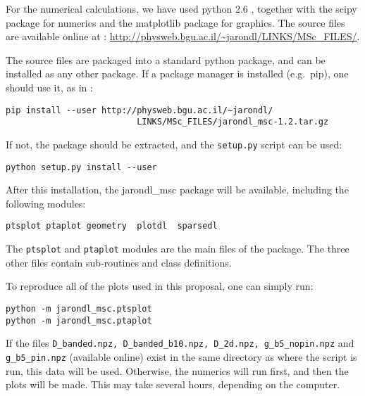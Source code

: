 For the numerical calculations, we have used python 2.6 \cite{guido_van_rossum_python}, together
with the scipy \cite{jones_scipy} package for numerics and the matplotlib \cite{hunter_matplotlib:_2007} package
for graphics. The source files are available online at : 
\url{http://physweb.bgu.ac.il/~jarondl/LINKS/MSc_FILES/}.


The source files are packaged into a standard python package,
and can be installed as any other package. If a package manager is installed (e.g.\ pip),
one should use it, as in :
\begin{verbatim}
pip install --user http://physweb.bgu.ac.il/~jarondl/
                          LINKS/MSc_FILES/jarondl_msc-1.2.tar.gz
\end{verbatim}
If not, the package should be extracted, and the \texttt{setup.py} script can be used:
\begin{verbatim}
python setup.py install --user
\end{verbatim}
After this installation, the jarondl\_msc package will be available,
including the following modules:
\begin{verbatim}
ptsplot ptaplot geometry  plotdl  sparsedl
\end{verbatim}

The \texttt{ptsplot} and \texttt{ptaplot} modules are the main files of the package. The three other files contain
sub-routines and class definitions.


To reproduce all of the plots used in this proposal, one can simply run:
\begin{verbatim}
python -m jarondl_msc.ptsplot
python -m jarondl_msc.ptaplot
\end{verbatim}
If the files \texttt{D\_banded.npz, D\_banded\_b10.npz, D\_2d.npz, g\_b5\_nopin.npz} and \texttt{g\_b5\_pin.npz} (available online)
exist in the same directory as where the script is run,
this data will be used. Otherwise, the numerics will run first, and then the plots will be made. This may take several hours,
depending on the computer.




